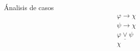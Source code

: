\begin{ruleinf} \label{relinf_cases} Ánalisis de casos
	\begin{equation}
	\begin{gathered}
		\varphi \rightarrow \chi \\
		\psi \rightarrow \chi  \\
		\underline {\varphi \lor \psi } \\
		\chi 
	\end{gathered}
	\end{equation}
\end{ruleinf}
